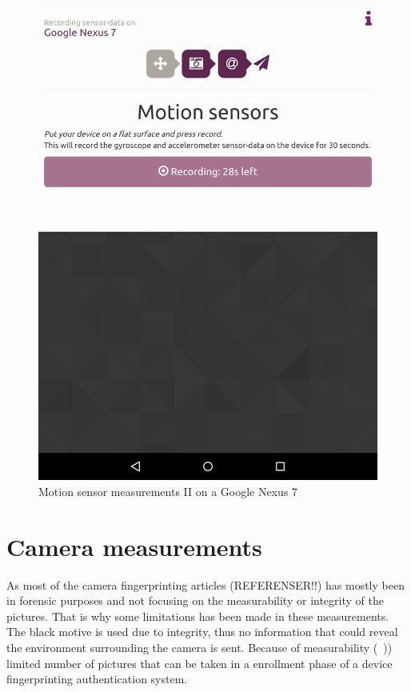 \begin{figure}[H]
\begin{minipage}[c]{.23\textwidth}
    \includegraphics[scale=0.15]{img/sensorrec-nexus-1-rec}
  \end{minipage}
  \caption{Motion sensor measurements II on a Google Nexus 7}
  \label{fig:sensorrec}
\end{figure}

\section{Camera measurements}\label{sec:measurement:camera}
As most of the camera fingerprinting articles (REFERENSER!!) has mostly been in forensic purposes and not focusing on the measurability or integrity of the pictures. That is why some limitations has been made in these measurements. The black motive is used due to integrity, thus no information that could reveal the environment surrounding the camera is sent. Because of measurability (~)) limited number of pictures that can be taken in a enrollment phase of a device fingerprinting authentication system.\\


